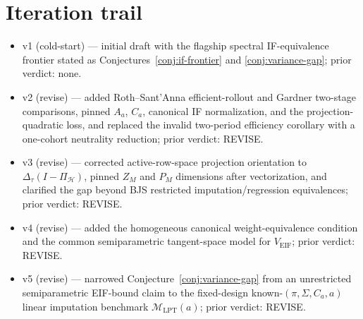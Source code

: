 \documentclass[11pt]{article}
\newcommand{\calH}{\mathcal{H}}
\theoremstyle{definition}
\theoremstyle{plain}
\theoremstyle{remark}
\begin{document}
\section{Iteration trail}
\begin{itemize}
\item v1 (cold-start) --- initial draft with the flagship spectral
IF-equivalence frontier stated as Conjectures~\ref{conj:if-frontier} and
\ref{conj:variance-gap}; prior verdict: none.
\item v2 (revise) --- added Roth--Sant'Anna efficient-rollout and Gardner
two-stage comparisons, pinned \(A_a\), \(C_a\), canonical IF normalization, and
the projection-quadratic loss, and replaced the invalid two-period efficiency
corollary with a one-cohort neutrality reduction; prior verdict: REVISE.
\item v3 (revise) --- corrected active-row-space projection orientation to
\(\Delta_\tau(I-\Pi_{\calH})\), pinned \(Z_M\) and \(P_M\) dimensions after
vectorization, and clarified the gap beyond BJS restricted imputation/regression
equivalences; prior verdict: REVISE.
\item v4 (revise) --- added the homogeneous canonical weight-equivalence
condition and the common semiparametric tangent-space model for
\(V_{\mathrm{EIF}}\); prior verdict: REVISE.
\item v5 (revise) --- narrowed Conjecture~\ref{conj:variance-gap} from an
unrestricted semiparametric EIF-bound claim to the fixed-design
known-\((\pi,\Sigma,C_a,a)\) linear imputation benchmark
\(\mathcal M_{\mathrm{LPT}}(a)\); prior verdict: REVISE.
\end{itemize}
\end{document}
